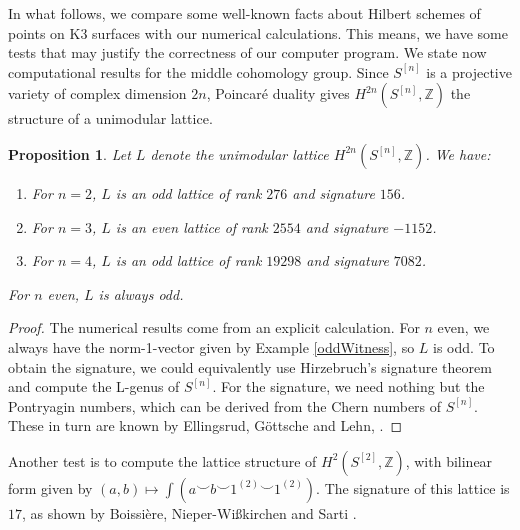 \documentclass{amsart}
\newcommand{\hilb}[1]{^{[#1]}}
\newcommand{\One}{1}
\newcommand{\IZ}{\mathbb{Z}}
\theoremstyle{plain}
\newtheorem{proposition}[theorem]{Proposition}
\theoremstyle{definition}
\theoremstyle{remark}
\begin{document}
In what follows, we compare some well-known facts about Hilbert schemes of points on K3 surfaces with our numerical calculations. This means, we have some tests that may justify the correctness of our computer program.
We state now computational results for the middle cohomology group. Since $S\hilb{n}$ is a projective variety of complex dimension $2n$, Poincar\'{e} duality gives $H^{2n}(S\hilb{n},\IZ)$ the structure of a unimodular lattice.  
\begin{proposition} Let $L$ denote the unimodular lattice $H^{2n}(S\hilb{n},\IZ)$. We have:
\begin{enumerate}
\item For $n=2$, $L$ is an odd lattice of rank $276$ and signature $156$.
\item For $n=3$, $L$ is an even lattice of rank $2554$ and signature $-1152$.
\item For $n=4$, $L$ is an odd lattice of rank $19298$ and signature $7082$.
\end{enumerate}
For $n$ even, $L$ is always odd. 
\end{proposition} 
\begin{proof}The numerical results come from an explicit calculation. For $n$ even, we always have the norm-1-vector given by Example \ref{oddWitness}, so $L$ is odd. To obtain the signature, we could equivalently use Hirzebruch's signature theorem and compute the L-genus of $S\hilb{n}$. For the signature, we need nothing but the Pontryagin numbers, which can be derived from the Chern numbers of $S\hilb{n}$. These in turn are known by Ellingsrud, G\"ottsche and Lehn, \cite[Rem. 5.5]{EGL}. 
\end{proof}
Another test is to compute the lattice structure of $H^2(S\hilb{2},\IZ)$, with bilinear form given by $(a,b)\longmapsto \int \left(a\smile b\smile \One^{(2)}\smile \One^{(2)}\right)$. The signature of this lattice is $17$, as shown by Boissi\`ere, Nieper-Wi{\ss}kirchen and Sarti \cite[Lemma 6.9]{BNS}.





\end{document}

